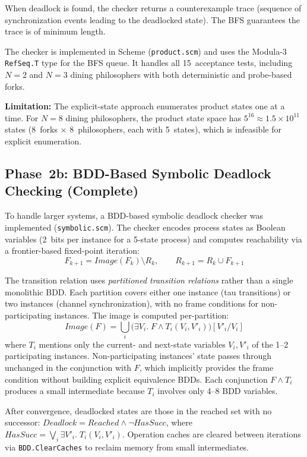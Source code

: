 \documentclass[11pt]{article}
\begin{document}
When deadlock is found, the checker returns a counterexample trace
(sequence of synchronization events leading to the deadlocked state).
The BFS guarantees the trace is of minimum length.

The checker is implemented in Scheme (\texttt{product.scm}) and uses
the Modula-3 \texttt{RefSeq.T} type for the BFS queue.  It handles
all 15~acceptance tests, including $N = 2$ and $N = 3$ dining
philosophers with both deterministic and probe-based forks.

\textbf{Limitation:} The explicit-state approach enumerates product
states one at a time.  For $N = 8$ dining philosophers, the product
state space has $5^{16} \approx 1.5 \times 10^{11}$ states
(8~forks $\times$ 8~philosophers, each with 5~states), which is
infeasible for explicit enumeration.

\subsection{Phase~2b: BDD-Based Symbolic Deadlock Checking (Complete)}

To handle larger systems, a BDD-based symbolic deadlock checker was
implemented (\texttt{symbolic.scm}).  The checker encodes process states
as Boolean variables (2~bits per instance for a 5-state process)
and computes reachability via a frontier-based fixed-point iteration:
\[
  F_{k+1} = \mathit{Image}(F_k) \setminus R_k, \qquad
  R_{k+1} = R_k \cup F_{k+1}
\]

The transition relation uses \emph{partitioned transition relations}
rather than a single monolithic BDD.  Each partition covers either
one instance (tau transitions) or two instances (channel synchronization),
with no frame conditions for non-participating instances.  The image
is computed per-partition:
\[
  \mathit{Image}(F) = \bigcup_{i} \bigl(
    \exists V_i.\; F \wedge T_i(V_i, V'_i)
  \bigr)[V'_i / V_i]
\]
where $T_i$ mentions only the current- and next-state variables
$V_i, V'_i$ of the 1--2 participating instances.  Non-participating
instances' state passes through unchanged in the conjunction with $F$,
which implicitly provides the frame condition without building explicit
equivalence BDDs.  Each conjunction $F \wedge T_i$ produces a small
intermediate because $T_i$ involves only 4--8 BDD variables.

After convergence, deadlocked states are those in the reached set with
no successor: $\mathit{Deadlock} = \mathit{Reached} \wedge \neg \mathit{HasSucc}$,
where $\mathit{HasSucc} = \bigvee_i \exists V'_i.\; T_i(V_i, V'_i)$.
Operation caches are cleared between iterations via
\texttt{BDD.ClearCaches} to reclaim memory from small intermediates.
\end{document}
